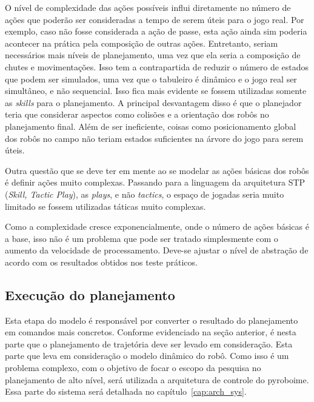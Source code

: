 O nível de complexidade das ações possíveis influi diretamente no número de
ações que poderão ser consideradas a tempo de serem úteis para o jogo real. Por
exemplo, caso não fosse considerada a ação de passe, esta ação ainda sim poderia
acontecer na prática pela composição de outras ações. Entretanto, seriam
necessários mais níveis de
planejamento, uma vez que ela seria a composição de chutes e movimentações. Isso tem a
contrapartida de reduzir o número de estados que podem ser simulados, uma vez
que o tabuleiro é dinâmico e o jogo real ser simultâneo, e não sequencial.
Isso fica mais evidente se fossem utilizadas somente as \textit{skills} para o
planejamento. A principal desvantagem disso é que o planejador teria que
considerar aspectos como colisões e a orientação dos robôs no planejamento
final. Além de ser ineficiente, coisas como posicionamento global dos robôs no
campo não teriam estados suficientes na árvore do jogo para serem úteis.

Outra questão que se deve ter em mente ao se modelar as ações básicas dos robôs
é definir ações muito complexas. Passando para a linguagem da arquitetura STP
(\textit{Skill, Tactic Play}), as \textit{plays}, e não \textit{tactics}, o
espaço de jogadas seria muito limitado se fossem utilizadas táticas muito
complexas.

Como a complexidade cresce exponencialmente, onde o número de ações básicas é
a base, isso não é um problema que pode ser tratado simplesmente com o aumento
da velocidade de processamento. Deve-se ajustar o nível de abstração de acordo
com os resultados obtidos nos teste práticos.

\subsection{Execução do planejamento}

Esta etapa do modelo é responsável por converter o resultado do planejamento em
comandos mais concretos. Conforme evidenciado na seção anterior, é nesta parte
que o planejamento de trajetória deve ser levado em consideração. Esta parte que
leva em consideração o modelo dinâmico do robô.
Como isso é um problema complexo, com o objetivo de focar o escopo da pesquisa
no planejamento de alto nível, será utilizada a arquitetura de controle do
pyroboime. Essa parte do sistema será detalhada no capítulo~\ref{cap:arch_sys}.

